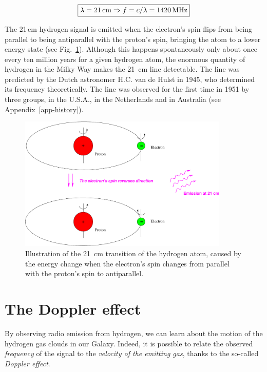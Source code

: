 \begin{equation}
\boxed{
\lambda = 21 \, {\rm cm}
\Rightarrow f=c/\lambda = 1420 \, {\rm MHz}}
\end{equation}

The 21\,cm hydrogen signal is emitted when the electron's spin flips from being
parallel to being antiparallel with the proton's spin, bringing the atom to a
lower energy state (see Fig.~\ref{fighyperfin}).  Although this happens
spontaneously only about once every ten million years for a given hydrogen
atom, the enormous quantity of hydrogen in the Milky Way makes the 21~cm line
detectable.  The line was predicted by the Dutch astronomer H.C. van de Hulst
in 1945, who determined its frequency theoretically.  The line was observed for
the first time in 1951 by three groups, in the U.S.A., in the Netherlands and
in Australia (see Appendix~\ref{app-history}).

\begin{figure}[ht]
\begin{center}
\includegraphics[width=10cm]{../figures/hyperfine.pdf}
\end{center}
\caption{Illustration of the 21~cm transition of the hydrogen atom, 
caused by the energy change when the electron's spin changes from 
parallel with the proton's spin to antiparallel.}
\label{fighyperfin}
\end{figure}  


\section{The Doppler effect}

By observing radio emission from hydrogen, we can learn about the motion of the
hydrogen gas clouds in our Galaxy.  Indeed, it is possible to relate the
observed {\em frequency} of the signal to the {\em velocity of the emitting
gas}, thanks to the so-called {\em Doppler effect}.

